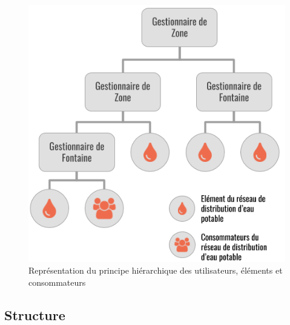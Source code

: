 \documentclass{EPL-master-thesis-covers-FR}
\begin{document}
			\begin{figure}[H]
				\centering
				\includegraphics[scale=0.45]{images/principe_hierarchique}
				\caption{Représentation du principe hiérarchique des utilisateurs, éléments et consommateurs}
				\label{fig:principe_hierarchique}
			\end{figure}

			\subsection*{Structure}

\end{document}
